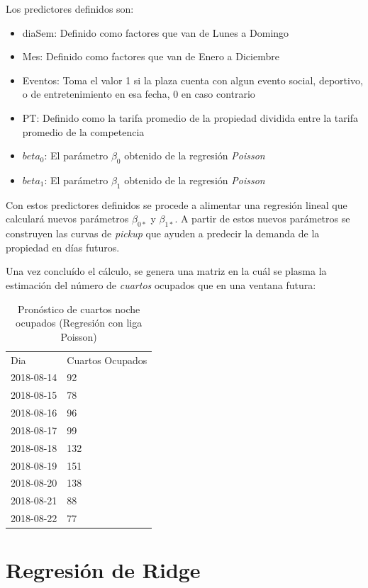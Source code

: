 Los predictores definidos son:

\begin{itemize}
  \item diaSem: Definido como factores que van de Lunes a Domingo
  \item Mes: Definido como factores que van de Enero a Diciembre
  \item Eventos: Toma el valor 1 si la plaza cuenta con algun evento social, deportivo, o de entretenimiento en esa fecha, 0 en caso contrario
  \item PT: Definido como la tarifa promedio de la propiedad dividida entre la tarifa promedio de la competencia
  \item $beta_0$: El parámetro $\beta_0$ obtenido de la regresión \emph{Poisson}
  \item $beta_1$: El parámetro $\beta_1$ obtenido de la regresión \emph{Poisson}
\end{itemize}


Con estos predictores definidos se procede a alimentar una regresión lineal que calculará nuevos parámetros $\beta_{0*}$ y $\beta_{1*}$. A partir de estos nuevos parámetros se construyen las curvas de \emph{pickup} que ayuden a predecir la demanda de la propiedad en días futuros.

Una vez concluído el cálculo, se genera una matriz en la cuál se plasma la estimación del número de \emph{cuartos} ocupados que en una ventana futura:

\begin{table}[H]
\centering
\begin{tabular}{ll}
Dia        & Cuartos Ocupados \\
2018-08-14 & 92               \\
2018-08-15 & 78               \\
2018-08-16 & 96               \\
2018-08-17 & 99               \\
2018-08-18 & 132              \\
2018-08-19 & 151              \\
2018-08-20 & 138              \\
2018-08-21 & 88               \\
2018-08-22 & 77              
\end{tabular}
\caption{Pronóstico de cuartos noche ocupados (Regresión con liga Poisson)} 
\end{table}


\section*{Regresión de Ridge}

